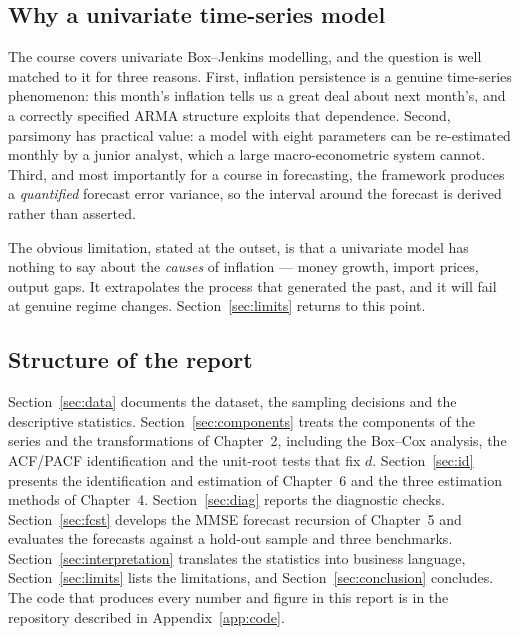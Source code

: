 \subsection{Why a univariate time-series model}

The course covers univariate Box--Jenkins modelling, and the question is well
matched to it for three reasons. First, inflation persistence is a genuine
time-series phenomenon: this month's inflation tells us a great deal about next
month's, and a correctly specified ARMA structure exploits that dependence.
Second, parsimony has practical value: a model with eight parameters can be
re-estimated monthly by a junior analyst, which a large macro-econometric system
cannot. Third, and most importantly for a course in forecasting, the framework
produces a \emph{quantified} forecast error variance, so the interval around the
forecast is derived rather than asserted.

The obvious limitation, stated at the outset, is that a univariate model has
nothing to say about the \emph{causes} of inflation --- money growth, import
prices, output gaps. It extrapolates the process that generated the past, and it
will fail at genuine regime changes. Section~\ref{sec:limits} returns to this
point.

\subsection{Structure of the report}

Section~\ref{sec:data} documents the dataset, the sampling decisions and the
descriptive statistics. Section~\ref{sec:components} treats the components of the
series and the transformations of Chapter~2, including the Box--Cox analysis, the
ACF/PACF identification and the unit-root tests that fix $d$. Section~\ref{sec:id}
presents the identification and estimation of Chapter~6 and the three estimation
methods of Chapter~4. Section~\ref{sec:diag} reports the diagnostic checks.
Section~\ref{sec:fcst} develops the MMSE forecast recursion of Chapter~5 and
evaluates the forecasts against a hold-out sample and three benchmarks.
Section~\ref{sec:interpretation} translates the statistics into business language,
Section~\ref{sec:limits} lists the limitations, and Section~\ref{sec:conclusion}
concludes. The code that produces every number and figure in this report is in the
repository described in Appendix~\ref{app:code}.

